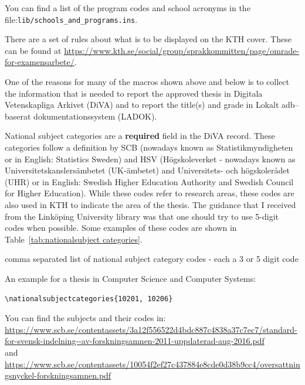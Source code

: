 \documentclass[examplethesis.tex]{subfiles}
\begin{document}
You can find a list of the program codes and school acronyms in the file:\linebreak[4] \texttt{lib/schools\_and\_programs.ins}.

There are a set of rules about what is to be displayed on the KTH cover. These can be found at \url{https://www.kth.se/social/group/sprakkommitten/page/omrade-for-examensarbete/}.

One of the reasons for many of the macros shown above and below is to collect the information that is needed to report the approved thesis in Digitala Vetenskapliga Arkivet (DiVA) and to report the title(s) and grade in \foreignlanguage{swedish}{Lokalt adb–baserat dokumentationssystem (LADOK)}.

National subject categories are a \textbf{required} field in the DiVA record. These categories follow a definition by \foreignlanguage{swedish}{SCB} (nowadays known as \foreignlanguage{swedish}{Statistikmyndigheten} or in English: Statistics Sweden) and HSV (\foreignlanguage{swedish}{Högskoleverket} - nowadays known as  \foreignlanguage{swedish}{Universitetskanslersämbetet (UK-ämbetet)} and \foreignlanguage{swedish}{Universitets- och högskolerådet (UHR)} or in English: Swedish Higher Education Authority and Swedish Council for Higher Education).
While these codes refer to research areas, these codes are also used in KTH to indicate the area of the thesis. The guidance that I received from the Linköping University library was that one should try to use 5-digit codes when possible. Some examples of these codes are shown in Table~\ref{tab:nationalsubject categories}.
\begin{description}[leftmargin=!, labelwidth =\widthof{\texttt{\textbackslash nationalsubjectcategories\{\}}}]
\item [\texttt{\textbackslash nationalsubjectcategories\{\}}] comma separated list of national subject category codes - each a 3 or 5 digit code
\end{description}

An example for a thesis in Computer Science and Computer Systems:
\begin{lstlisting}[style=latexExampleForAuthors]
\nationalsubjectcategories{10201, 10206}
\end{lstlisting}

You can find the subjects and their codes in:\\ \url{https://www.scb.se/contentassets/3a12f556522d4bdc887c4838a37c7ec7/standard-for-svensk-indelning--av-forskningsamnen-2011-uppdaterad-aug-2016.pdf}\\
and\\
\url{https://www.scb.se/contentassets/10054f2ef27c437884e8cde0d38b9cc4/oversattningsnyckel-forskningsamnen.pdf}
\end{document}
